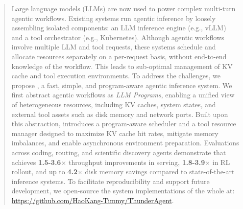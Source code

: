 \begin{abstract}
    Large language models (LLMs) are now used to power complex multi-turn agentic workflows. Existing systems run agentic inference by loosely assembling isolated components: an LLM inference engine (e.g., vLLM) and a tool orchestrator (e.g., Kubernetes). Although agentic workflows involve multiple LLM and tool requests, these systems schedule and allocate resources separately on a per-request basis, without end-to-end knowledge of the workflow. This leads to sub-optimal management of KV cache and tool execution environments. To address the challenges, we propose \ouralg, a fast, simple, and program-aware agentic inference system. We first abstract agentic workflows as \textit{LLM Programs}, enabling a unified view of heterogeneous resources, including KV caches, system states, and external tool assets such as disk memory and network ports. Built upon this abstraction, \ouralg introduces a program-aware scheduler and a tool resource manager designed to maximize KV cache hit rates, mitigate memory imbalances, and enable asynchronous environment preparation. Evaluations across coding, routing, and scientific discovery agents demonstrate that \ouralg achieves \textbf{1.5-3.6$\times$} throughput improvements in serving, \textbf{1.8-3.9$\times$} in RL rollout, and up to \textbf{4.2$\times$} disk memory savings compared to state-of-the-art inference systems. To facilitate reproducibility and support future  development, we open-source the system implementations of the whole \ouralg at: \url{https://github.com/HaoKang-Timmy/ThunderAgent}.
\end{abstract}